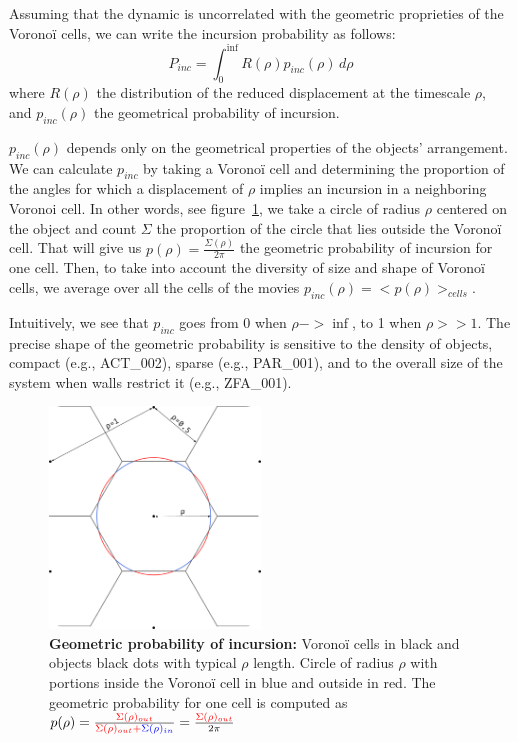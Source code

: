     Assuming that the dynamic is uncorrelated with the geometric proprieties of the Voronoï cells, we can write the incursion probability as follows:
        $$P_{inc}=\int_{0}^{\inf} R(\rho)p_{inc}(\rho) \,d \rho$$
    where $R(\rho)$ the distribution of the reduced displacement at the timescale $\rho$, and $p_{inc}(\rho)$ the geometrical probability of incursion.

    $p_{inc}(\rho)$ depends only on the geometrical properties of the objects' arrangement. We can calculate $p_{inc}$ by taking a Voronoï cell and determining the proportion of the angles for which a displacement of $\rho$ implies an incursion in a neighboring Voronoi cell. In other words, see figure~\ref{part_1:fig_pinc}, we take a circle of radius $\rho$ centered on the object and count $\Sigma$ the proportion of the circle that lies outside the Voronoï cell. That will give us $p(\rho)=\frac{\Sigma(\rho)}{2\pi}$ the geometric probability of incursion for one cell. Then, to take into account the diversity of size and shape of Voronoï cells, we average over all the cells of the movies $p_{inc}(\rho)=<p(\rho)>_{cells}$.

    Intuitively, we see that $p_{inc}$ goes from 0 when $\rho->\inf$, to 1 when $\rho>>1$. The precise shape of the geometric probability is sensitive to the density of objects, compact (e.g., ACT\_002), sparse (e.g., PAR\_001), and to the overall size of the system when walls restrict it (e.g., ZFA\_001).

	\begin{figure}[h!]
    \centering
    \includegraphics[width=0.5\textwidth]{part_1/assets/Figure_pinc.png}
    \caption{\textbf{Geometric probability of incursion:} Voronoï cells in black and objects black dots with typical $\rho$ length. Circle of radius $\rho$ with portions inside the Voronoï cell in blue and outside in red. The geometric probability for one cell is computed as $p(\rho)=\frac{\color{red}{\Sigma(\rho)_{out}}}{\color{red}{\Sigma(\rho)_{out}} + \color{blue}{\Sigma(\rho)_{in}}} = \frac{\color{red}{\Sigma(\rho)_{out}}}{2\pi}$}
    \label{part_1:fig_pinc}
    \end{figure}

